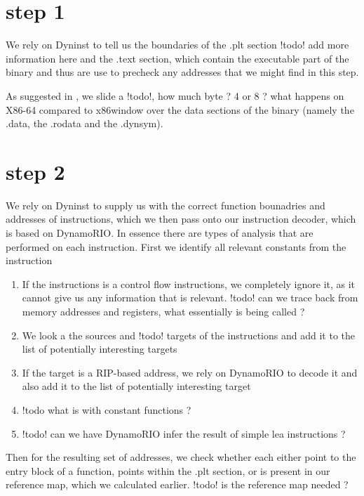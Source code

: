 \section{step 1} We rely on Dyninst to tell us the boundaries of the .plt section {!todo! add more information here} and the .text section, which contain the executable part of the binary and thus are use to precheck any addresses that we might find in this step.

As suggested in \cite{ZhangSekar00}, we slide a {!todo!, how much byte ? 4 or 8 ? what happens on X86-64 compared to x86}window over the data sections of the binary (namely the .data, the .rodata and the .dynsym).



\section{step 2}
We rely on Dyninst \cite{dyninst00} to supply us with the correct function bounadries and addresses of instructions, which we then pass onto our instruction decoder, which is based on DynamoRIO. In essence there are types of analysis that are performed on each instruction. First we identify all relevant constants from the instruction
\begin{enumerate}
\item If the instructions is a control flow instructions, we completely ignore it, as it cannot give us any information that is relevant. {!todo! can we trace back from memory addresses and registers, what essentially is being called ?}
\item We look a the sources and {!todo! targets} of the instructions and add it to the list of potentially interesting targets
\item If the target is a RIP-based address, we rely on DynamoRIO to decode it and also add it to the list of potentially interesting target

\item {!todo what is with constant functions ?}
\item {!todo! can we have DynamoRIO infer the result of simple lea instructions ?}
\end{enumerate}

Then for the resulting set of addresses, we check whether each either point to the entry block of a function, points within the .plt section, or is present in our reference map, which we calculated earlier. {!todo! is the reference map needed ?}
